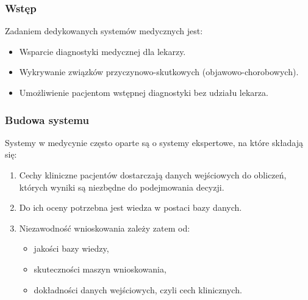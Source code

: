 
\begin{frame}
\frametitle{Wstęp}

Zadaniem dedykowanych systemów medycznych jest:
\begin{itemize}
 \item Wsparcie diagnostyki medycznej dla lekarzy.
 \item Wykrywanie związków przyczynowo-skutkowych (objawowo-chorobowych).
 \item Umożliwienie pacjentom wstępnej diagnostyki bez udziału lekarza.
\end{itemize}

\end{frame}

\begin{frame}
\frametitle{Budowa systemu}

Systemy w medycynie często oparte są o systemy ekspertowe, na które składają się:
\begin{enumerate}
\item Cechy kliniczne pacjentów dostarczają danych wejściowych do obliczeń, których wyniki są niezbędne do podejmowania decyzji.
\item Do ich oceny potrzebna jest wiedza w postaci bazy danych.
\item Niezawodność wnioskowania zależy zatem od:
  \begin{itemize}
    \item jakości bazy wiedzy,
    \item skuteczności maszyn wnioskowania,
    \item dokładności danych wejściowych, czyli cech klinicznych.
  \end{itemize}
\end{enumerate}
\end{frame}
